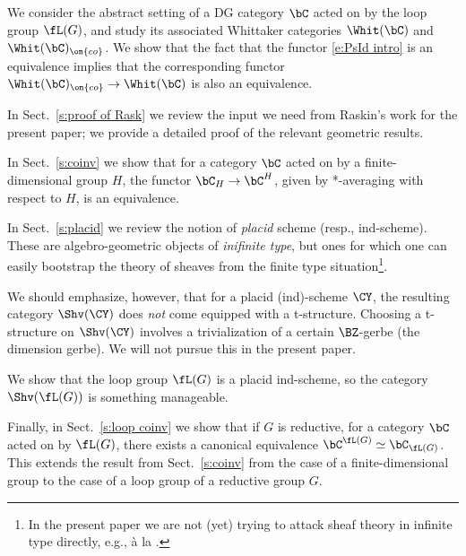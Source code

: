 \documentclass[9pt]{amsart}
\theoremstyle{definition}
\theoremstyle{remark}
\newcommand{\secref}[1]{Sect.~\ref{#1}}
\numberwithin{equation}{section}
\begin{document}
\medskip

We consider the abstract setting of a DG category $\bC$ acted on by the loop group $\fL(G)$, and study its associated
Whittaker categories $\Whit(\bC)$ and $\Whit(\bC)_{\on{co}}$. We show that the fact that the functor \eqref{e:PsId intro}
is an equivalence implies that the corresponding functor $\Whit(\bC)_{\on{co}}\to \Whit(\bC)$ is also an equivalence.

\sssec{}

In \secref{s:proof of Rask} we review the input we need from Raskin's work \cite{Ras} for the present paper;
we provide a detailed proof of the relevant geometric results.

\sssec{}

In \secref{s:coinv} we show that for a category $\bC$ acted on by a finite-dimensional group $H$, the functor
$\bC_H\to \bC^H$, given by *-averaging with respect to $H$, is an equivalence.

\sssec{}

In \secref{s:placid} we review the notion of {\it placid} scheme (resp., ind-scheme). These are algebro-geometric
objects of \emph{inifinite type}, but ones for which one can easily bootstrap the theory of sheaves from the
finite type situation\footnote{In the present paper we are not (yet) trying to attack sheaf theory in infinite type 
directly, e.g., \`a la \cite{BS}.}. 

\medskip

We should emphasize, however, that for a placid (ind)-scheme $\CY$, the resulting category $\Shv(\CY)$ does \emph{not} 
come equipped with a t-structure. Choosing a t-structure on $\Shv(\CY)$ involves a trivialization of a certain $\BZ$-gerbe
(the dimension gerbe). We will not pursue this in the present paper. 

\medskip

We show that the loop group $\fL(G)$ is a placid ind-scheme, so the category $\Shv(\fL(G))$
is something manageable. 

\sssec{}

Finally, in \secref{s:loop coinv} we show that if $G$ is reductive, for a category $\bC$ acted on by $\fL(G)$, there
exists a canonical equivalence $\bC^{\fL(G)}\simeq \bC_{\fL(G)}$. This extends the result from \secref{s:coinv} from
the case of a finite-dimensional group to the case of a loop group of a reductive group $G$. 


\sssec{}  \label{sss:algebraic geometry}
\end{document}

